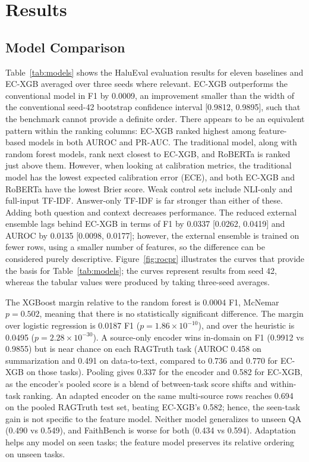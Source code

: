 \documentclass[a4paper,fleqn]{cas-sc}
\begin{document}
\section{Results}\label{sec:results}

\subsection{Model Comparison}

Table~\ref{tab:models} shows the HaluEval evaluation results for eleven baselines and EC-XGB averaged over three seeds where relevant. EC-XGB outperforms the conventional model in F1 by 0.0009, an improvement smaller than the width of the conventional seed-42 bootstrap confidence interval [0.9812, 0.9895], such that the benchmark cannot provide a definite order. There appears to be an equivalent pattern within the ranking columns: EC-XGB ranked highest among feature-based models in both AUROC and PR-AUC. The traditional model, along with random forest models, rank next closest to EC-XGB, and RoBERTa is ranked just above them. However, when looking at calibration metrics, the traditional model has the lowest expected calibration error (ECE), and both EC-XGB and RoBERTa have the lowest Brier score. Weak control sets include NLI-only and full-input TF-IDF. Answer-only TF-IDF is far stronger than either of these. Adding both question and context decreases performance. The reduced external ensemble lags behind EC-XGB in terms of F1 by 0.0337 [0.0262, 0.0419] and AUROC by 0.0135 [0.0098, 0.0177]; however, the external ensemble is trained on fewer rows, using a smaller number of features, so the difference can be considered purely descriptive. Figure~\ref{fig:rocpr} illustrates the curves that provide the basis for Table~\ref{tab:models}; the curves represent results from seed 42, whereas the tabular values were produced by taking three-seed averages.

The XGBoost margin relative to the random forest is 0.0004 F1, McNemar $p = 0.502$, meaning that there is no statistically significant difference. The margin over logistic regression is 0.0187 F1 ($p = 1.86\times10^{-10}$), and over the heuristic is 0.0495 ($p = 2.28\times10^{-30}$). A source-only encoder wins in-domain on F1 (0.9912 vs 0.9855) but is near chance on each RAGTruth task (AUROC 0.458 on summarization and 0.491 on data-to-text, compared to 0.736 and 0.770 for EC-XGB on those tasks). Pooling gives 0.337 for the encoder and 0.582 for EC-XGB, as the encoder's pooled score is a blend of between-task score shifts and within-task ranking. An adapted encoder on the same multi-source rows reaches 0.694 on the pooled RAGTruth test set, beating EC-XGB's 0.582; hence, the seen-task gain is not specific to the feature model. Neither model generalizes to unseen QA (0.490 vs 0.549), and FaithBench is worse for both (0.434 vs 0.594). Adaptation helps any model on seen tasks; the feature model preserves its relative ordering on unseen tasks.
\end{document}
